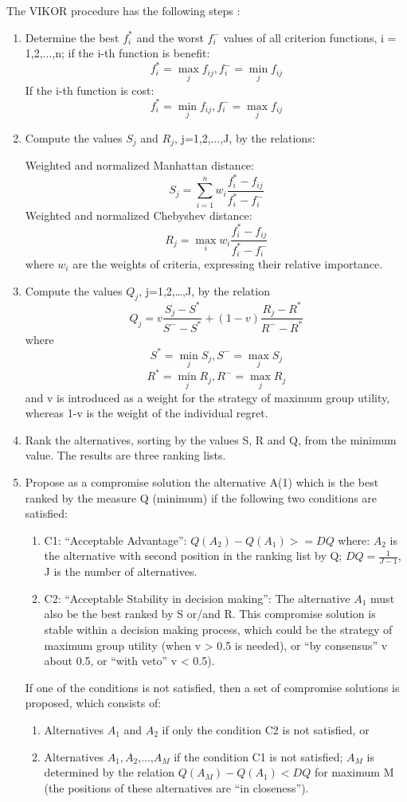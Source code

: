 The VIKOR procedure has the following steps \cite{VIKOR_method_wiki}:
\begin{enumerate}
    \item Determine the best $f_{i}^{*}$ and the worst $f_{i}^{-}$ values of all criterion functions, i = 1,2,...,n; if the i-th function is benefit:
    $$f_{i}^{*} =  \max\limits_{j} f_{ij} , f_{i}^{-} = \min\limits_{j} f_{ij}$$
    If the i-th function is cost:
    $$f_{i}^{*} = \min\limits_{j} f_{ij} ,f_{i}^{-} = \max\limits_{j} f_{ij}$$
    \item Compute the values $S_{j}$ and $R_{j}$, j=1,2,...,J, by the relations: 
    
    Weighted and normalized Manhattan distance:
    $$S_{j}=\sum_{i=1}^{n} w_{i} \frac{f_{i}^{*} - f_{ij}}{f_{i}^{*} - f_{i}^{-}}$$
    Weighted and normalized Chebyshev distance:
    $$R_{j}=\max\limits_{i} w_{i} \frac{f_{i}^{*} - f_{ij}}{f_{i}^{*} - f_{i}^{-}}$$
    where $w_{i}$ are the weights of criteria, expressing their relative importance.
    \item Compute the values $Q_{j}$, j=1,2,…,J, by the relation
    $$Q_{j} = v \frac{S_{j}-S^{*}}{S^{-}-S^{*}} + (1-v)\frac{R_{j}-R^{*}}{R^{-}-R^{*}}$$
    where 
    $$ S^{*} = \min\limits_{j} S_{j},
    S^{-} = \max\limits_{j} S_{j} $$
    $$ R^{*} = \min\limits_{j} R_{j},
    R^{-} = \max\limits_{j} R_{j} $$
    and v is introduced as a weight for the strategy of maximum group utility, whereas 1-v is the weight of the individual regret.
    \item Rank the alternatives, sorting by the values S, R and Q, from the minimum value. The results are three ranking lists.
    \item Propose as a compromise solution the alternative A(1) which is the best ranked by the measure Q (minimum) if the following two conditions are satisfied:
    \begin{enumerate}
        \item C1: “Acceptable Advantage”: $Q(A_{2})-Q(A_{1}) >= DQ$
        where: $A_{2}$ is the alternative with second position in the ranking list by Q; $DQ = \frac{1}{J-1}$, J is the number of alternatives.
        \item C2: “Acceptable Stability in decision making”: The alternative $A_{1}$ must also be the best ranked by S or/and R. This compromise solution is stable within a decision making process, which could be the strategy of maximum group utility (when v > 0.5 is needed), or “by consensus” v about 0.5, or “with veto” v < 0.5).
    \end{enumerate}
    If one of the conditions is not satisfied, then a set of compromise solutions is proposed, which consists of:
    \begin{enumerate}
        \item Alternatives $A_{1}$ and $A_{2}$ if only the condition C2 is not satisfied, or
        \item Alternatives $A_{1},A_{2}$,...,$A_{M}$ if the condition C1 is not satisfied; $A_{M}$ is determined by the relation $Q(A_{M})-Q(A_{1}) < DQ$ for maximum M (the positions of these alternatives are “in closeness”).
    \end{enumerate}
\end{enumerate}

